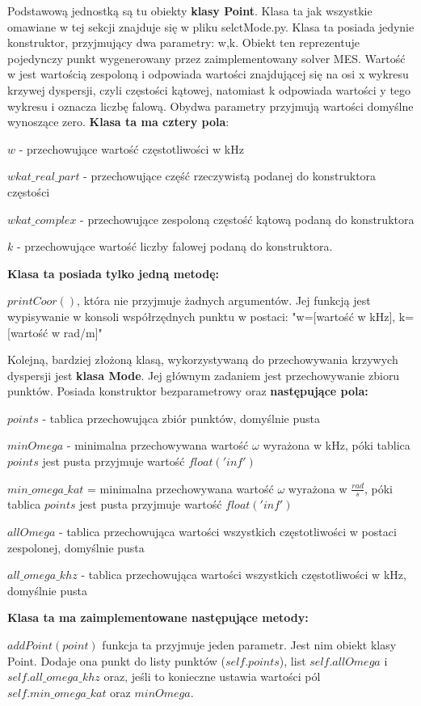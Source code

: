 Podstawową jednostką są tu obiekty \textbf{klasy Point}. Klasa ta jak wszystkie omawiane w tej sekcji znajduje się w pliku selctMode.py. Klasa ta posiada jedynie konstruktor, przyjmujący dwa parametry: w,k. Obiekt ten reprezentuje pojedynczy punkt wygenerowany przez zaimplementowany solver MES. Wartość w jest wartością zespoloną i odpowiada wartości znajdującej się na osi x wykresu krzywej dyspersji, czyli częstości kątowej, natomiast k odpowiada wartości y tego wykresu i oznacza liczbę falową. Obydwa parametry przyjmują wartości domyślne wynoszące zero. \textbf{Klasa ta ma cztery pola}:

$w$ - przechowujące wartość częstotliwości w kHz

$wkat\_real\_part$ - przechowujące część rzeczywistą podanej do konstruktora częstości

$wkat\_complex$ - przechowujące zespoloną częstość kątową podaną do konstruktora

$k$ - przechowujące wartość liczby falowej podaną do konstruktora.

\textbf{Klasa ta posiada tylko jedną metodę:}

$printCoor()$, która nie przyjmuje żadnych argumentów. Jej funkcją jest wypisywanie w konsoli współrzędnych punktu w postaci: "w=[wartość w kHz], k=[wartość w rad/m]"

Kolejną, bardziej złożoną klasą, wykorzystywaną do przechowywania krzywych dyspersji jest \textbf{klasa Mode}. Jej głównym zadaniem jest przechowywanie zbioru punktów. Posiada konstruktor bezparametrowy oraz \textbf{następujące pola:}

$points$ - tablica przechowująca zbiór punktów, domyślnie pusta

$minOmega$ - minimalna przechowywana wartość $\omega$ wyrażona w kHz, póki tablica $points$ jest pusta przyjmuje wartość $float('inf')$

$min\_omega\_kat$ = minimalna przechowywana wartość $\omega$ wyrażona w $\frac{rad}{s}$, póki tablica $points$ jest pusta przyjmuje wartość $float('inf')$

$allOmega$ - tablica przechowująca wartości wszystkich częstotliwości w postaci zespolonej, domyślnie pusta

$all\_omega\_khz$ - tablica przechowująca wartości wszystkich częstotliwości w kHz, domyślnie pusta

\textbf{Klasa ta ma zaimplementowane następujące metody:}

$addPoint(point)$ funkcja ta przyjmuje jeden parametr. Jest nim obiekt klasy Point. Dodaje ona punkt do listy punktów ($self.points$), list $self.allOmega$ i $self.all\_omega\_khz$ oraz, jeśli to konieczne ustawia wartości pól $self.min\_omega\_kat$ oraz $minOmega$.


